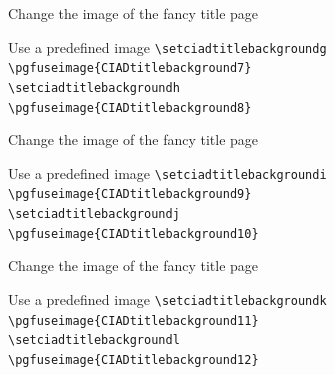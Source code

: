 \documentclass[english,sectioncirclenumberstyle]{ciadbeamer}
\begin{document}
\begin{frame}{Change the image of the fancy title page \insertcontinuationtext}
	\begin{block}{Use a predefined image}
		\texttt{{\textbackslash}setciadtitlebackgroundg}  \\
		\texttt{\textbackslash{}pgfuseimage\{CIADtitlebackground7\}} \\
		\texttt{{\textbackslash}setciadtitlebackgroundh}  \\
		\texttt{\textbackslash{}pgfuseimage\{CIADtitlebackground8\}}
	\end{block}
\end{frame}

\begin{frame}{Change the image of the fancy title page \insertcontinuationtext}
	\begin{block}{Use a predefined image}
		\texttt{{\textbackslash}setciadtitlebackgroundi}  \\
		\texttt{\textbackslash{}pgfuseimage\{CIADtitlebackground9\}} \\
		\texttt{{\textbackslash}setciadtitlebackgroundj}  \\
		\texttt{\textbackslash{}pgfuseimage\{CIADtitlebackground10\}}
	\end{block}
\end{frame}

\begin{frame}{Change the image of the fancy title page \insertcontinuationtext}
	\begin{block}{Use a predefined image}
		\texttt{{\textbackslash}setciadtitlebackgroundk}  \\
		\texttt{\textbackslash{}pgfuseimage\{CIADtitlebackground11\}} \\
		\texttt{{\textbackslash}setciadtitlebackgroundl}  \\
		\texttt{\textbackslash{}pgfuseimage\{CIADtitlebackground12\}}
	\end{block}
\end{frame}
\end{document}
